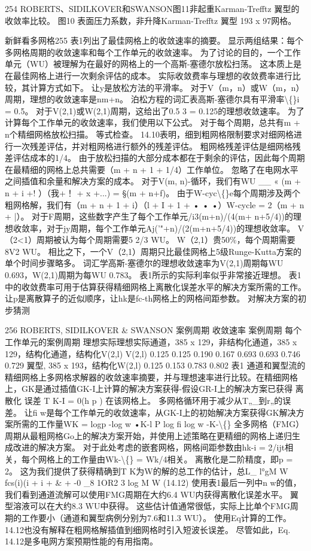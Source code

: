 \documentclass[UTF8,11pt,a4paper,openany,fontset=fandol]{ctexbook}
\begin{document}
254 ROBERTS、SIDILKOVER和SWANSON图11非起重Karman-Trefftz 翼型的收敛率比较。 图10 表面压力系数，非升降Karman-Trefftz 翼型 193 x 97网格。

新鲜看多网格255 表1列出了最佳网格上的收敛速率的摘要。 显示两组结果：每个多网格周期的收敛速率和每个工作单元的收敛速率。 为了讨论的目的，一个工作单元（WU）被理解为在最好的网格上的一个高斯-塞德尔放松扫荡。 这本质上是在最佳网格上进行一次剩余评估的成本。 实际收敛费率与理想的收敛费率进行比较，其计算方式如下。 让y是放松方法的平滑率。 对于V（m，n）或W（m，n）周期，理想的收敛速率是nm+n。 泊松方程的词汇表高斯-塞德尔具有平滑率\textbackslash\{\}i = 0.5。 对于V(2,1)或W(2,1)周期，这给出了0.5 3 = 0.125的理想收敛速率。 为了计算每个工作单元的收敛速率，我们使用以下公式。 对于每个周期，总共有m + n个精细网格放松扫描。 等式检查。 14.10表明，细到粗网格限制要求对细网格进行一次残差评估，并对粗网格进行额外的残差评估。 粗网格残差评估是细网格残差评估成本的1/4。 由于放松扫描的大部分成本都在于剩余的评估，因此每个周期在最精细的网格上总共需要（m + n + 1 + 1/4）工作单位。 忽略了在电网水平之间插值和余量和解决方案的成本。 对于V(m, n)-循环，我们有WU \_\_ « (m + n + i +! ）（我+！ + x +...) = §(m + n+f)。 由于W-cyc\textbackslash\{\}e每个周期涉及两个粗网格解，我们有（m + n + 1 + i）（l + I + 1 + • • •）W-cycle = 2（m + n + |）。 对于F周期，这些数字产生了每个工作单元/i3(m+n)/(4(m+ n+5/4))的理想收敛率，对于jy周期，每个工作单元Aj('"+n)/(2(m+n+5/4))的理想收敛率。 V（2<1）周期被认为每个周期需要5 2/3 WU。 W（2,1）贵50\%，每个周期需要8V2 WU。 相比之下，一个V（2,1）周期只比最佳网格上5级Runge-Kutta方案的单个时间步骤略多。 词汇学高斯-塞德尔的理想收敛速率为V(2,1)周期每WU 0.693，W(2,1)周期为每WU 0.783。 表1所示的实际利率似乎非常接近理想。 表1中的收敛费率可用于估算获得精细网格上离散化误差水平的解决方案所需的工作。 让p是离散算子的近似顺序，让hk是fc-th网格上的网格间距参数。 对解决方案的初步猜测

256 ROBERTS, SIDILKOVER \& SWANSON 案例周期 收敛速率 案例周期 每个工作单元的案例周期 理想实际理想实际通道，385 x 129，非结构化通道，385 x 129，结构化通道，结构化V(2,l) V(2,l) 0.125 0.125 0.190 0.167 0.693 0.693 0.746 0.729 翼型, 385 x 193，结构化W(2,l) 0.125 0.153 0.783 0.802 表1 通道和翼型流的精细网格上多网格求解器的收敛速率摘要，并与理想速率进行比较。在精细网格上，GK是通过插值GK-I上计算的解决方案获得-假设GR-I上的解决方案已获得 离散化 误差 T K-I = 0(h p ) 在该网格上。 多网格循环用于减少从T„\_到r„的误差。 让fi w是每个工作单元的收敛速率，从GK-I上的初始解决方案获得GK解决方案所需的工作量WK = logp -log w •K-l P log fi log w -K-\textbackslash\{\} 全多网格（FMG）周期从最粗网格Go上的解决方案开始，并使用上述策略在更精细的网格上递归生成改进的解决方案。 对于此处考虑的嵌套网格，网格间距参数由hk-i = 2/ijt相关，每个网格上的工作量由Wk-\textbackslash\{\} = Wk/4相关。 离散化是二阶精度，即p = 2。 这为我们提供了获得精确到T K为W的解的总工作的估计，总L\_ l°gM W fcs(i)(i + i + \& + -0 \_8 1OR2 3 log M W (14.12) 使用表1最后一列中n w的值，我们看到通道流解可以使用FMG周期在大约6.4 WU内获得离散化误差水平。 翼型溶液可以在大约8.3 WU中获得。 这些估计值通常很低，实际上比单个FMG周期的工作要小（通道和翼型病例分别为7.6和11.3 WU）。 使用Eq计算的工作。 14.12也没有解释在粗网格解插值到细网格时引入短波长误差。 尽管如此，Eq. 14.12是多电网方案预期性能的有用指南。
\end{document}
